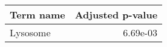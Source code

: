 \begin{tabular}{lr}
\toprule
Term name &  Adjusted p-value \\
\midrule
 Lysosome &          6.69e-03 \\
\bottomrule
\end{tabular}
